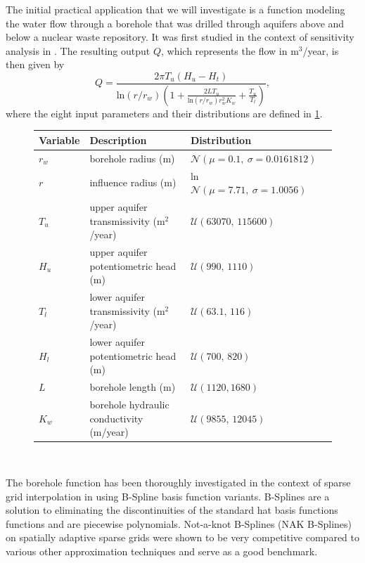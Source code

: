 \documentclass[
  a4paper,  %
  twoside,  %
  bibliography=totoc,
  headsepline,
  cleardoublepage=empty,
  parskip=half,
  draft=false
]{scrbook}
\begin{document}
The initial practical application that we will investigate is a function modeling the water flow through a borehole that was drilled through aquifers above and below a nuclear waste repository.
It was first studied in the context of sensitivity analysis in \cite{Harper1983}.
The resulting output $Q$, which represents the flow in m$^3$/year, is then given by
\begin{equation}
Q=\frac{2 \pi T_u(H_u - H_t)}{\text{ln}(r / r_w) \left( 1 + \frac{2L T_u}{\text{ln}(r / r_w) r_w^2 K_w} + \frac{T_u}{T_l} \right)},
\end{equation}
where the eight input parameters and their distributions are defined in \cref{tab:borehole_params}.
\begin{mdframed}[style=style]
\begin{figure}[H]
\centering
\bgroup
\def\arraystretch{1.2}%
  \begin{tabular}{ l l l l}
Variable & Description & Distribution\\
\hline
$r_w$ & borehole radius (m) & $\mathcal{N}(\mu=0.1, ~\sigma=0.0161812)$\\
$r$ & influence radius (m) & ln $\mathcal{N}(\mu=7.71, ~\sigma=1.0056)$\\
$T_u$ & upper aquifer transmissivity (m$^2$/year) & $\mathcal{U}(63070,\, 115600)$\\
$H_u$ & upper aquifer potentiometric head (m) & $\mathcal{U}(990,\,  1110)$\\
$T_l$ & lower aquifer transmissivity (m$^2$/year) & $\mathcal{U}(63.1,\, 116)$\\
$H_l$ & lower aquifer potentiometric head (m) & $\mathcal{U}(700, \, 820)$\\
$L$ & borehole length (m) & $\mathcal{U}(1120, 1680)$\\
$K_w$ & borehole hydraulic conductivity (m/year) & $\mathcal{U}(9855, \, 12045)$\\
\end{tabular}
\egroup\\
\vspace{0.5em}
\delimit
{}
\label{tab:borehole_params}
\end{figure}
\end{mdframed}
%
The borehole function has been thoroughly investigated in the context of sparse grid interpolation in \cite{} using B-Spline basis function variants.
B-Splines are a solution to eliminating the discontinuities of the standard hat basis functions functions and are piecewise polynomials.
Not-a-knot B-Splines (NAK B-Splines) on spatially adaptive sparse grids were shown to be very competitive compared to various other approximation techniques and serve as a good benchmark.
\end{document}
